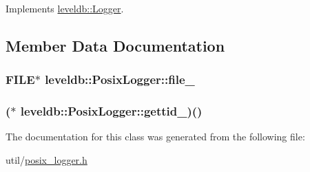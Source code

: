 Implements \hyperlink{classleveldb_1_1_logger_a408e238a0028a45e9cc7aec6ad2277c5}{leveldb\-::\-Logger}.



\subsection{Member Data Documentation}
\hypertarget{classleveldb_1_1_posix_logger_a7aee075e8c3eff4d15e1eb76fc111dbe}{
\subsubsection[{file\-\_\-}]{\setlength{\rightskip}{0pt plus 5cm}F\-I\-L\-E$\ast$ leveldb\-::\-Posix\-Logger\-::file\-\_\-\hspace{0.3cm}{\ttfamily [private]}}}\label{classleveldb_1_1_posix_logger_a7aee075e8c3eff4d15e1eb76fc111dbe}
\hypertarget{classleveldb_1_1_posix_logger_a09c66b539e2462e5dac3fa009b1674ff}{
\subsubsection[{gettid\-\_\-}]{($\ast$ leveldb\-::\-Posix\-Logger\-::gettid\-\_\-)()\hspace{0.3cm}{\ttfamily [private]}}}\label{classleveldb_1_1_posix_logger_a09c66b539e2462e5dac3fa009b1674ff}


The documentation for this class was generated from the following file\-:\begin{DoxyCompactItemize}
\item 
util/\hyperlink{posix__logger_8h}{posix\-\_\-logger.\-h}\end{DoxyCompactItemize}
